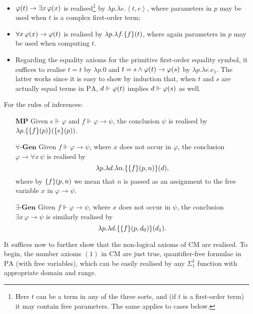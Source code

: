 \documentclass[11pt]{article}
\theoremstyle{plain}
\theoremstyle{definition}
\newcommand{\tuple}[1]{\left\langle #1 \right\rangle}
\begin{document}
\begin{itemize}
    \item $\varphi\mleft(t\mright) \rightarrow \exists x \, \varphi\mleft(x\mright)$ is realised\footnote{Here $t$ can be a term in any of the three sorts, and (if $t$ is a first-order term) it may contain free parameters. The same applies to cases below.} by $\lambda p. \lambda e. \tuple{t, e}$, where parameters in $p$ may be used when $t$ is a complex first-order term;
    \item $\forall x \, \varphi\mleft(x\mright) \rightarrow \varphi\mleft(t\mright)$ is realised by $\lambda p. \lambda f. \mleft\{f\mright\}\mleft(t\mright)$, where again parameters in $p$ may be used when computing $t$.
    \item Regarding the equality axioms for the primitive first-order equality symbol, it suffices to realise $t = t$ by $\lambda p. 0$ and $t = s \land \varphi\mleft(t\mright) \rightarrow \varphi\mleft(s\mright)$ by $\lambda p. \lambda e. e_1$. The latter works since it is easy to show by induction that, when $t$ and $s$ are actually equal terms in $\mathrm{PA}$, $d \Vdash \varphi\mleft(t\mright)$ implies $d \Vdash \varphi\mleft(s\mright)$ as well.
\end{itemize}

For the rules of inferences:
\begin{itemize}
    \item[$\mathbf{MP}$] Given $e \Vdash \varphi$ and $f \Vdash \varphi \rightarrow \psi$, the conclusion $\psi$ is realised by $\lambda p. \mleft\{\mleft\{f\mright\}\mleft(p\mright)\mright\}\mleft(\mleft\{e\mright\}\mleft(p\mright)\mright)$.
    \item[$\forall$-$\mathbf{Gen}$] Given $f \Vdash \varphi \rightarrow \psi$, where $x$ does not occur in $\varphi$, the conclusion $\varphi \rightarrow \forall x \, \psi$ is realised by
          \[\lambda p. \lambda d. \lambda n. \mleft\{\mleft\{f\mright\}\mleft(p, n\mright)\mright\}\mleft(d\mright),\]
          where by $\mleft\{f\mright\}\mleft(p, n\mright)$ we mean that $n$ is passed as an assignment to the free variable $x$ in $\varphi \rightarrow \psi$.
    \item[$\exists$-$\mathbf{Gen}$] Given $f \Vdash \varphi \rightarrow \psi$, where $x$ does not occur in $\psi$, the conclusion $\exists x \, \varphi \rightarrow \psi$ is similarly realised by
          \[\lambda p. \lambda d. \mleft\{\mleft\{f\mright\}\mleft(p, d_0\mright)\mright\}\mleft(d_1\mright).\]
\end{itemize}

It suffices now to further show that the non-logical axioms of $\mathrm{CM}$ are realised. To begin, the number axioms $\left(1\right)$ in $\mathrm{CM}$ are just true, quantifier-free formulae in $\mathrm{PA}$ (with free variables), which can be easily realised by any $\Sigma^1_1$ function with appropriate domain and range.
\end{document}
